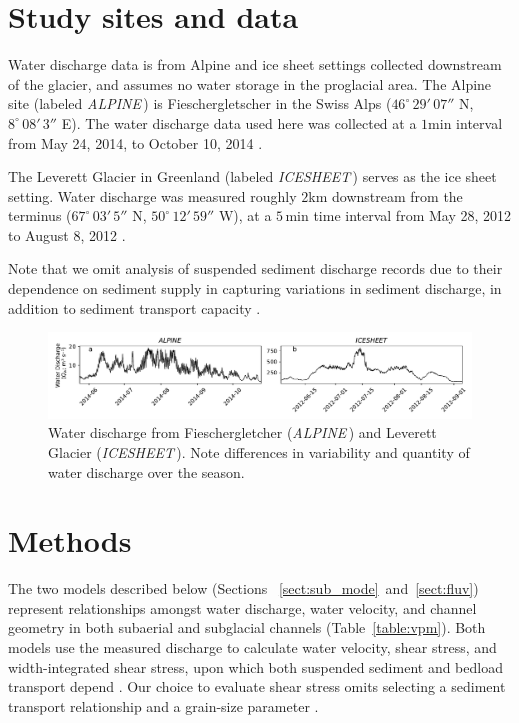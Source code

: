 \documentclass[esurf, manuscript]{copernicus}
\newcommand{\alpine}{\textit{ALPINE}\,}
\newcommand{\icesheet}{\textit{ICESHEET}\,}
\begin{document}
\section{Study sites and data}
\label{sect:ss_data}

Water discharge data is  from Alpine and ice sheet settings collected downstream of the glacier, and assumes no water storage in the proglacial area.
The Alpine site (labeled \alpine{}) is  Fieschergletscher in the Swiss Alps ($46^\circ\,29'\,07''$ N, $8^\circ\,08'\,3''$ E).
The water discharge data used here was collected at a $1$\unit{min} interval from May 24, 2014, to October 10, 2014 \citep[Figure~\ref{fig:Qw}\,a][]{felix2022}.

The Leverett Glacier in Greenland (labeled \icesheet{}) serves as the ice sheet setting.
Water discharge was measured roughly $2$\unit{km} downstream from the terminus ($67^\circ\,03'\,5''$ N, $50^\circ\,12'\,59''$ W), at a $5$\,\unit{min} time interval from May 28, 2012 to August 8, 2012 \citet[][Figure~\ref{fig:Qw}\,b]{tedstone2013}.

Note that we omit analysis of suspended sediment discharge records due to their dependence on sediment supply in capturing variations in sediment discharge, in addition to sediment transport capacity \citep[e.g.][]{delaney2019}.

\begin{figure}[hbt!]
  \centering
  \includegraphics[width=0.8\linewidth]{Fig2.pdf}
  \caption{Water discharge from Fieschergletcher (\alpine) and Leverett Glacier (\icesheet).
    Note differences in variability and quantity of water discharge over the season.
  }
  \label{fig:Qw}
\end{figure}


\section{Methods}
\label{sect:meth}
The two models described below (Sections ~\ref{sect:sub_mode}~and~\ref{sect:fluv}) represent relationships amongst water discharge, water velocity, and channel geometry in both subaerial and subglacial channels (Table~\ref{table:vpm}).
Both models use the measured discharge to calculate water velocity, shear stress, and width-integrated shear stress, upon which both suspended sediment and bedload transport depend \citep[Figure \ref{fig:cartoon}; ][]{shields1936}.
Our choice to evaluate shear stress omits selecting a sediment transport relationship and a grain-size parameter \citep[e.g.][]{shields1936,meyer1948}.
\end{document}
